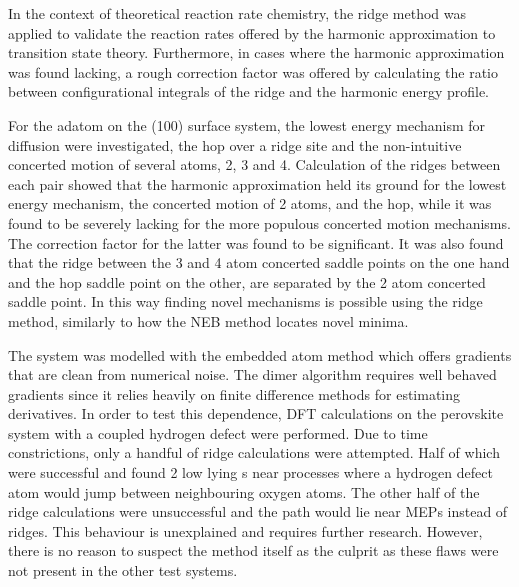 In the context of theoretical reaction rate chemistry, the ridge method was applied to validate the reaction rates offered by the harmonic approximation to transition state theory.
Furthermore, in cases where the harmonic approximation was found lacking, a rough correction factor was offered by calculating the ratio between configurational integrals of the ridge and the harmonic energy profile.

For the  adatom on the (100) surface system, the lowest energy mechanism for diffusion were investigated, the hop over a ridge site and the non-intuitive concerted motion of several atoms, 2, 3 and 4.
Calculation of the ridges between each pair showed that the harmonic approximation held its ground for the lowest energy mechanism, the concerted motion of 2 atoms, and the hop, while it was found to be severely lacking for the more populous concerted motion mechanisms.
The correction factor for the latter was found to be significant.
It was also found that the ridge between the 3 and 4 atom concerted saddle points on the one hand and the hop saddle point on the other, are separated by the 2 atom concerted saddle point.
In this way finding novel mechanisms is possible using the ridge method, similarly to how the NEB method locates novel minima.

The  system was modelled with the embedded atom method which offers gradients that are clean from numerical noise.
The dimer algorithm requires well behaved gradients since it relies heavily on finite difference methods for estimating derivatives.
In order to test this dependence, DFT calculations on the  perovskite system with a coupled hydrogen defect were performed.
Due to time constrictions, only a handful of ridge calculations were attempted.
Half of which were successful and found 2 low lying s near processes where a hydrogen defect atom would jump between neighbouring oxygen atoms.
The other half of the ridge calculations were unsuccessful and the path would lie near MEPs instead of ridges.
This behaviour is unexplained and requires further research.
However, there is no reason to suspect the method itself as the culprit as these flaws were not present in the other test systems.


